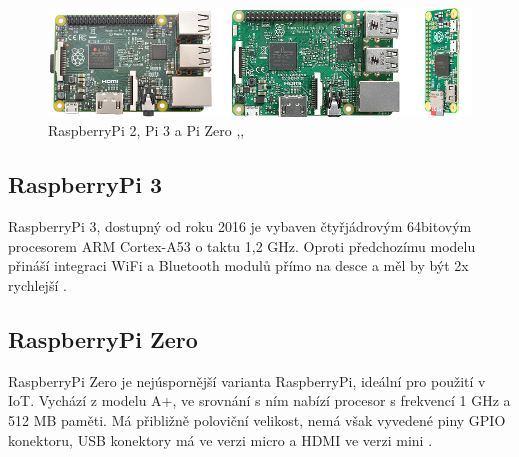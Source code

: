 	\begin{figure}[!h]
  \begin{center}
   \includegraphics[scale=0.6]{obrazky/embed_raspi_all}
  \end{center}
  \caption{RaspberryPi 2, Pi 3 a Pi Zero \cite{RaspiTwo},\cite{RaspiThree},\cite{RaspiZero}}
\end{figure}

	\newpage

\subsection{RaspberryPi 3}
		RaspberryPi 3, dostupný od roku 2016 je vybaven čtyřjádrovým 64bitovým procesorem ARM Cortex-A53 o taktu 1,2 GHz. Oproti předchozímu modelu přináší integraci WiFi a Bluetooth modulů přímo na desce a měl by být 2x rychlejší \cite{RaspiThree}.
		

	
		
\subsection{RaspberryPi Zero}
		RaspberryPi Zero je nejúspornější varianta RaspberryPi, ideální pro použití v IoT. Vychází z modelu A+, ve srovnání s ním nabízí procesor s frekvencí 1 GHz a 512 MB paměti. Má přibližně poloviční velikost, nemá však vyvedené piny GPIO konektoru, USB konektory má ve verzi micro a HDMI ve verzi mini \cite{RaspiZero}.

